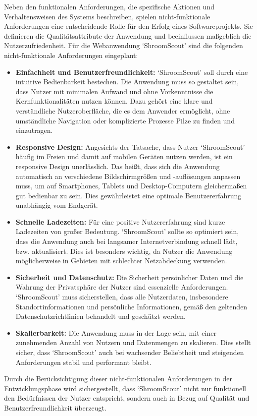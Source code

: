 Neben den funktionalen Anforderungen, die spezifische Aktionen und Verhaltensweisen des Systems beschreiben, spielen
nicht-funktionale Anforderungen eine entscheidende Rolle für den Erfolg eines Softwareprojekts. Sie definieren die
Qualitätsattribute der Anwendung und beeinflussen maßgeblich die Nutzerzufriedenheit. Für die Webanwendung `ShroomScout'
sind die folgenden nicht-funktionale Anforderungen eingeplant:

\begin{itemize}

	\item \textbf{Einfachheit und Benutzerfreundlichkeit:}
	      `ShroomScout' soll durch eine intuitive Bedienbarkeit bestechen. Die Anwendung muss so gestaltet sein, dass Nutzer mit
	      minimalen Aufwand und ohne Vorkenntnisse die Kernfunktionalitäten nutzen können. Dazu gehört eine klare und verständliche
	      Nutzeroberfläche, die es dem Anwender ermöglicht, ohne umständliche Navigation oder komplizierte Prozesse Pilze zu finden
	      und einzutragen.

	\item \textbf{Responsive Design:}
	      Angesichts der Tatsache, dass Nutzer `ShroomScout' häufig im Freien und damit auf mobilen Geräten nutzen werden, ist ein
	      responsive Design unerlässlich. Das heißt, dass sich die Anwendung automatisch an verschiedene Bildschirmgrößen und -auflösungen
	      anpassen muss, um auf Smartphones, Tablets und Desktop-Computern gleichermaßen gut bedienbar zu sein. Dies gewährleistet eine
	      optimale Benutzererfahrung unabhängig vom Endgerät.

	\item \textbf{Schnelle Ladezeiten:}
	      Für eine positive Nutzererfahrung sind kurze Ladezeiten von großer Bedeutung. `ShroomScout' sollte so optimiert sein, dass die
	      Anwendung auch bei langsamer Internetverbindung schnell lädt, bzw. aktualisiert. Dies ist besonders wichtig, da Nutzer die Anwendung
	      möglicherweise in Gebieten mit schlechter Netzabdeckung verwenden.

	\item \textbf{Sicherheit und Datenschutz:}
	      Die Sicherheit persönlicher Daten und die Wahrung der Privatsphäre der Nutzer sind essenzielle Anforderungen. `ShroomScout'
	      muss sicherstellen, dass alle Nutzerdaten, insbesondere Standortinformationen und persönliche Informationen, gemäß den
	      geltenden Datenschutzrichtlinien behandelt und geschützt werden.

	\item \textbf{Skalierbarkeit:}
	      Die Anwendung muss in der Lage sein, mit einer zunehmenden Anzahl von Nutzern und Datenmengen zu skalieren. Dies stellt
	      sicher, dass `ShroomScout' auch bei wachsender Beliebtheit und steigenden Anforderungen stabil und performant bleibt.

\end{itemize}

Durch die Berücksichtigung dieser nicht-funktionalen Anforderungen in der Entwicklungsphase wird sichergestellt, dass `ShroomScout'
nicht nur funktionell den Bedürfnissen der Nutzer entspricht, sondern auch in Bezug auf Qualität und Benutzerfreundlichkeit überzeugt.
